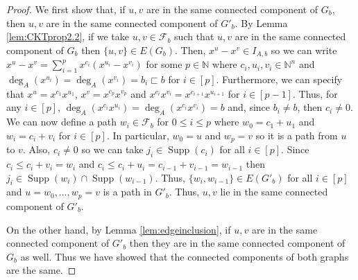 \documentclass[a4paper, 12pt]{article}
\newcommand{\NN}{\mathbb N}
\theoremstyle{plain}
\theoremstyle{definition}
\theoremstyle{remark}
\begin{document}
\begin{proof}
    We first show that, if $u,v$ are in the same connected component of $G_b$, then $u,v$ are in the same connected component of $G'_b$. By Lemma \ref{lem:CKTprop2.2}, if we take $u,v \in \mathcal{F}_b$ such that $u,v$ are in the same connected component of $G_b$ then $\{u,v\} \in E(G_b)$. Then, $x^u-x^v \in I_{A,b}$ so we can write $x^u-x^v=\sum_{i=1}^p x^{c_i}(x^{u_i}-x^{v_i})$ for some $p \in \NN$ where $c_i,u_i,v_i \in \NN^n$ and $\deg_A(x^{u_i})=\deg_A(x^{v_i})=b_i \sqsubset b$ for $i \in [p]$. Furthermore, we can specify that $x^u=x^{c_1} x^{u_1}$, $x^v=x^{c_p} x^{v_p}$ and $x^{c_i}x^{v_i}=x^{c_{i+1}}x^{u_{i+1}}$ for $i \in [p-1]$. Thus, for any $i \in [p]$, $\deg_A(x^{c_i}x^{u_i})=\deg_A(x^{c_i}x^{v_i})=b$ and, since $b_i \neq b$, then $c_i \neq 0$. We can now define a path $w_i \in \mathcal{F}_b$ for $0 \le i \le p$ where $w_0=c_1+u_1$ and  $w_i=c_i+v_i$ for $i \in [p]$. In particular, $w_0=u$ and $w_p=v$ so it is a path from $u$ to $v$. Also, $c_i \neq 0$ so we can take $j_i \in \operatorname{Supp}(c_i)$ for all $i \in [p]$. Since $c_i \le c_i+v_i=w_i$ and $c_i \le c_i+u_i=c_{i-1}+v_{i-1}=w_{i-1}$ then $j_i \in \operatorname{Supp}(w_i) \cap \operatorname{Supp}(w_{i-1})$. Thus, $\{w_i,w_{i-1}\} \in E(G'_b)$ for all $i \in [p]$ and $u=w_0,\dots,w_p=v$ is a path in $G'_b$. Thus, $u,v$ lie in the same connected component of $G'_b$.

    On the other hand, by Lemma \ref{lem:edgeinclusion}, if $u,v$ are in the same connected component of $G'_b$ then they are in the same connected component of $G_b$ as well. Thus we have showed that the connected components of both graphs are the same.
\end{proof}


% 
\end{document}
